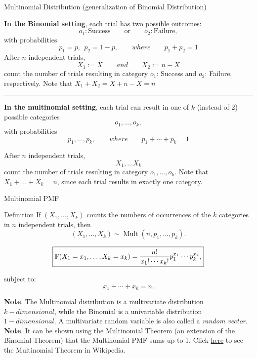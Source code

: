 \begin{frame}{Multinomial Distribution (generalization of Binomial Distribution)}

\textbf{In the Binomial setting}, each trial has two possible outcomes:
\[
o_1:\text{Success}
\qquad\text{or}\qquad
o_2: \text{Failure},
\]
with probabilities
\[
p_1 = p,\ \ 
p_2 = 1-p, \qquad where \qquad p_1 + p_2 =1
\]
After $n $ independent trials,
$$
X_1 :=X \qquad and \qquad X_2:= n-X
$$
count the number of trials resulting in category $o_1$: Success and $o_2$: Failure, respectively. Note that $X_1 + X_2 = X+ n-X=n$

\vspace{2mm}
\hrule
\vspace{2mm}

\textbf{In the multinomial setting}, each trial can result in one of $k$ (instead of 2) possible categories
\[
o_1,\dots,o_k,
\]
with probabilities
\[
p_1,\dots,p_k, \qquad where \qquad p_1 + \cdots + p_k=1
\]

After $n$ independent trials, 
\[
X_1,\dots X_k
\]
count the number of trials resulting in category $o_1,\dots, o_k$. Note that $X_1 + \dots +X_k=n$, since each trial results in exactly one category.

\end{frame}

\begin{frame}{Multinomial PMF}

\begin{keybox}{Definition}
If $(X_1,\dots,X_k)$ counts the numbers of occurrences of the $k$ categories in $n$ independent trials, then
\[
\boxed{
(X_1,\dots,X_k)
\sim
\operatorname{Mult}(n,p_1,\dots,p_k).
}
\]
\end{keybox}
\[
\boxed{
\mathbb{P}(X_1=x_1,\dots,X_k=x_k)
=
\frac{
n!
}{
x_1!\cdots x_k!
}
p_1^{x_1}\cdots p_k^{x_k},
}
\]

subject to:
\[
x_1+\cdots+x_k=n.
\]



\textbf{Note}. The Multinomial distribution is a multivariate distribution $k-dimensional$, while the Binomial is a univariable distribution $1-dimensional$. A multivariate random variable is also called a \textit{random vector}.
\vspace{1mm}
\textbf{Note}. It can be shown using the Multinomial Theorem (an extension of the Binomial Theorem) that the Multinomial PMF sums up to 1. Click \href{https://en.wikipedia.org/wiki/Multinomial_theorem}{here} to see the Multinomial Theorem in Wikipedia.

\end{frame}














